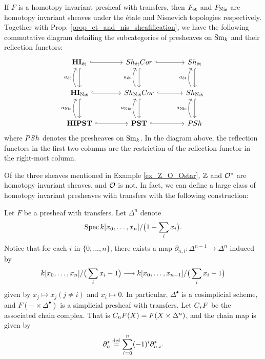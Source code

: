 \begin{rmk}
If $F$ is a homotopy invariant presheaf with transfers, then
$\Etale{F}$ and $\NisSh{F}$ are homotopy invariant sheaves under
the \'etale and Nisnevich topologies respectively. Together with
Prop. \ref{prop_et_and_nis_sheafification}, we have the following
commutative diagram detailing the subcategories of presheaves on
$\Sm$ and their reflection functors:
\[
\begin{tikzcd}[column sep=large, row sep=large]
\HIEt \arrow[hookrightarrow]{r} \arrow[hookrightarrow]{d} &
\ShEtCor \arrow[hookrightarrow]{r} \arrow[hookrightarrow]{d} &
\ShEt \arrow[hookrightarrow]{d} \\
\HINis \arrow[hookrightarrow]{r} \arrow[hookrightarrow]{d} 
\arrow[bend left]{u}{\etale}&
\ShNisCor \arrow[hookrightarrow]{r} \arrow[hookrightarrow]{d} 
\arrow[bend left]{u}{\etale}&
\ShNis \arrow[hookrightarrow]{d} 
\arrow[bend left]{u}{\etale}\\
\HIPST \arrow[hookrightarrow]{r} \arrow[bend left]{u}{\nis} &
\PST \arrow[hookrightarrow]{r} \arrow[bend left]{u}{\nis}&
\PSh \arrow[bend left]{u}{\nis}
\end{tikzcd}
\]
where $\PSh$ denotes the presheaves on $\Sm$. In the diagram
above, the reflection functors in the first two columns
are the restriction of the reflection functor in the right-most
column.
\end{rmk}

Of the three sheaves mentioned in Example \ref{ex_Z_O_Ostar}, $\Z$
and $\Ox$ are homotopy invariant sheaves, and $\O$ is not. In fact,
we can define a large class of homotopy invariant presheaves with
transfers with the following construction:

\begin{constr}\label{constr_suslin_C}
Let $F$ be a presheaf with transfers. Let $\Delta^n$ denote
\[
\Spec \basefield [x_0,\dots,x_n]/\big(1 - \sum_{i} x_i \big).
\]
Notice that for each $i$ in $\{0,...,n\}$, there exists a map 
$\partial_{n, i} : \Delta^{n - 1} \to \Delta^{n}$ induced by
\[
\basefield [x_0,\dots,x_n]/\big(\sum_{i} x_i - 1 \big)
\to \basefield [x_0,\dots,x_{n - 1}]/\big(\sum_{i} x_i - 1 \big)
\]
given by $x_j \mapsto x_j (j \neq i)$ and $x_i \mapsto 0$. In
particular, $\Delta^{\bullet}$ is a cosimplicial scheme, and 
$F( - \times \Delta^\bullet)$ is a simplicial presheaf with
transfers. Let $\suslC F$ be the associated chain complex. That
is $\suslC[n] F(X) = F(X \times \Delta^n)$, and the chain map
is given by
\[
\partial_{n}^* \defeq \sum_{i = 0}^{n} (-1)^i \partial_{n,i}^*.
\]
\end{constr}

